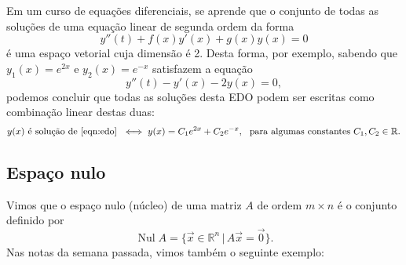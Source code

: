 \begin{ex}
	Em um curso de equações diferenciais, se aprende que o conjunto de todas as soluções de uma equação linear de segunda ordem da forma
	\begin{equation}
	y''(t) + f(x) y'(x) + g(x) y(x) = 0
	\end{equation} é uma espaço vetorial cuja dimensão é 2. Desta forma, por exemplo, sabendo que $y_1(x) = e^{2x}$ e $y_2 (x) = e^{-x}$ satisfazem a equação
	\begin{equation}\label{eqn:edo}
	y''(t) - y'(x) -2 y(x) = 0,
	\end{equation} podemos concluir que todas as soluções desta EDO podem ser escritas como combinação linear destas duas:
	\begin{equation}
	y(x) \text{ é solução de \eqref{eqn:edo} } \iff y(x) = C_1 e^{2x} + C_2 e^{-x}, \ \text{ para algumas constantes } C_1, C_2 \in \mathbb{R}.
	\end{equation}
\end{ex}


\subsection{Espaço nulo}

Vimos que o espaço nulo (núcleo) de uma matriz $A$ de ordem $m \times n$ é o conjunto definido por
\begin{equation}
\operatorname{Nul} A = \big\{ \vec{x} \in \mathbb{R}^n \, | \, A\vec{x} = \vec{0}  \big\}.
\end{equation} Nas notas da semana passada, vimos também o seguinte exemplo:

